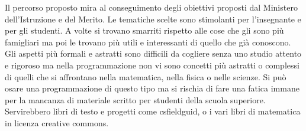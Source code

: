 \documentclass{easychair}
\begin{document}
Il percorso proposto mira al conseguimento degli obiettivi proposti dal Ministero
dell'Istruzione e del Merito.
Le tematiche scelte sono stimolanti per l'insegnante e per gli studenti.
A volte si trovano smarriti rispetto alle cose che gli sono più famigliari ma
poi le trovano più utili e interessanti di quello che già conoscono.
Gli aspetti più formali e astratti sono difficili da cogliere senza uno
studio attento e rigoroso ma nella programmazione non vi sono concetti più
astratti o complessi di quelli che si affrontano nella matematica, nella fisica
o nelle scienze.
Si può osare una programmazione di questo tipo ma si rischia di fare una fatica
immane per la mancanza di materiale scritto per studenti della scuola superiore.
Servirebbero libri di testo e progetti come csfieldguid, o i vari libri di
matematica in licenza creative commons.

\label{sect:bib}

%
%
%

\end{document}
